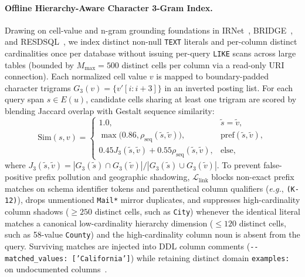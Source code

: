 \documentclass[10pt,twocolumn]{article}
\begin{document}
\paragraph{Offline Hierarchy-Aware Character 3-Gram Index.}
Drawing on cell-value and n-gram grounding foundations in IRNet~\cite{guo2019irnet}, BRIDGE~\cite{lin2020bridge}, and RESDSQL~\cite{li2023resdsql}, we index distinct non-null \texttt{TEXT} literals and per-column distinct cardinalities once per database without issuing per-query \texttt{LIKE} scans across large tables (bounded by $M_{\max}=500$ distinct cells per column via a read-only URI connection). Each normalized cell value $v$ is mapped to boundary-padded character trigrams $G_3(v) = \{v'[i:i+3]\}$ in an inverted posting list. For each query span $s \in E(u)$, candidate cells sharing at least one trigram are scored by blending Jaccard overlap with Gestalt sequence similarity:
\begin{equation}
  \text{Sim}(s, v) =
  \begin{cases}
    1.0, & \tilde{s} = \tilde{v}, \\
    \max\big(0.86, \rho_{\text{seq}}(\tilde{s}, \tilde{v})\big), & \text{pref}(\tilde{s}, \tilde{v}), \\
    0.45 J_3(\tilde{s}, \tilde{v}) + 0.55 \rho_{\text{seq}}(\tilde{s}, \tilde{v}), & \text{else,}
  \end{cases}
\end{equation}
where $J_3(\tilde{s}, \tilde{v}) = |G_3(\tilde{s}) \cap G_3(\tilde{v})| / |G_3(\tilde{s}) \cup G_3(\tilde{v})|$. To prevent false-positive prefix pollution and geographic shadowing, $\mathcal{L}_{\text{link}}$ blocks non-exact prefix matches on schema identifier tokens and parenthetical column qualifiers (\emph{e.g.}, \texttt{(K-12)}), drops unmentioned \texttt{Mail*} mirror duplicates, and suppresses high-cardinality column shadows ($\ge 250$ distinct cells, such as \texttt{City}) whenever the identical literal matches a canonical low-cardinality hierarchy dimension ($\le 120$ distinct cells, such as 58-value \texttt{County}) and the high-cardinality column noun is absent from the query. Surviving matches are injected into DDL column comments (\texttt{{-}{-} matched\_\allowbreak values: ['California']}) while retaining distinct domain \texttt{examples:} on undocumented columns~\cite{gao2024dailsql,talaei2024chess}.
\end{document}

